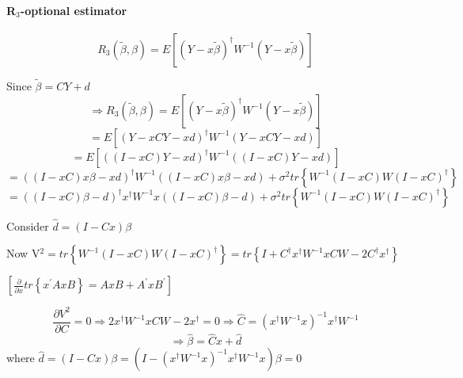 \documentclass{article}
\begin{document}
\bigskip

\paragraph{R$_{3}$-optional estimator}

\begin{equation*}
R_{3}\left( \tilde{\beta},\beta \right) =E\left[ \left( Y-x\tilde{\beta}%
\right) ^{\dagger }W^{-1}\left( Y-x\tilde{\beta}\right) \right]
\end{equation*}

Since $\tilde{\beta}=CY+d$%
\begin{equation*}
\Rightarrow R_{3}\left( \tilde{\beta},\beta \right) =E\left[ \left( Y-x%
\tilde{\beta}\right) ^{\dagger }W^{-1}\left( Y-x\tilde{\beta}\right) \right] 
\end{equation*}%
\begin{equation*}
=E\left[ \left( Y-xCY-xd\right) ^{\dagger }W^{-1}\left( Y-xCY-xd\right) %
\right] 
\end{equation*}%
\begin{equation*}
=E\left[ \left( \left( I-xC\right) Y-xd\right) ^{\dagger }W^{-1}\left(
\left( I-xC\right) Y-xd\right) \right] 
\end{equation*}%
\begin{equation*}
=\left( \left( I-xC\right) x\beta -xd\right) ^{\dagger }W^{-1}\left( \left(
I-xC\right) x\beta -xd\right) +\sigma ^{2}tr\left\{ W^{-1}\left( I-xC\right)
W\left( I-xC\right) ^{\dagger }\right\} 
\end{equation*}%
\begin{equation*}
=\left( \left( I-xC\right) \beta -d\right) ^{\dagger }x^{\dagger
}W^{-1}x\left( \left( I-xC\right) \beta -d\right) +\sigma ^{2}tr\left\{
W^{-1}\left( I-xC\right) W\left( I-xC\right) ^{\dagger }\right\} 
\end{equation*}

Consider $\hat{d}=\left( I-Cx\right) \beta $

Now V$^{2}=tr\left\{ W^{-1}\left( I-xC\right) W\left( I-xC\right) ^{\dagger
}\right\} =tr\left\{ I+C^{\dagger }x^{\dagger }W^{-1}xCW-2C^{\dagger
}x^{\dagger }\right\} $

$\left[ \frac{\partial }{\partial x}tr\left\{ x^{\prime }AxB\right\}
=AxB+A^{\prime }xB^{\prime }\right] $

\begin{equation*}
\frac{\partial V^{2}}{\partial C}=0\Rightarrow 2x^{\dagger
}W^{-1}xCW-2x^{\dagger }=0\Rightarrow \hat{C}=\left( x^{\dagger
}W^{-1}x\right) ^{-1}x^{\dagger }W^{-1}
\end{equation*}%
\begin{equation*}
\Rightarrow \hat{\beta}=\hat{C}x+\hat{d}
\end{equation*}%
where $\hat{d}=\left( I-Cx\right) \beta =\left( I-\left( x^{\dagger
}W^{-1}x\right) ^{-1}x^{\dagger }W^{-1}x\right) \beta =0$
\end{document}
